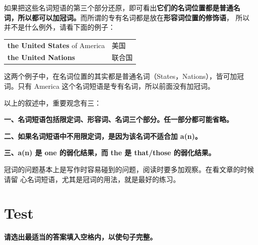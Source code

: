 如果把这些名词短语的第三个部分还原，即可看出\textbf{它们的名词位置都是普通名
  词，所以都可以加冠词。}而所谓的专有名词都是放在\textbf{形容词位置的修饰语}，
所以并不是什么例外，请看下面的例子：

\begin{longtable}[]{@{}ll@{}}
  \textbf{the United States} of America& 美国 \\
  \textbf{the United Nations} & 联合国 \\
\end{longtable}

这两个例子中，在名词位置的其实都是普通名词（States，Nations），皆可加冠词。只有
America 这个名词短语是专有名词，所以前面没有加冠词。

以上的叙述中，重要观念有三：

\textbf{一、名词短语包括限定词、形容词、名词三个部分。任一部分都可能省略。}

\textbf{二、如果名词短语中不用限定词，是因为该名词不适合加 a(n)。}

\textbf{三、a(n) 是 one 的弱化结果，而 the 是 that/those 的弱化结果。}

冠词的问题基本上是写作时容易碰到的问题，阅读时要多加观察。在看文章的时候请留
心名词短语，尤其是冠词的用法，就是最好的练习。

\section{Test}


\textbf{请选出最适当的答案填入空格内，以使句子完整。}

